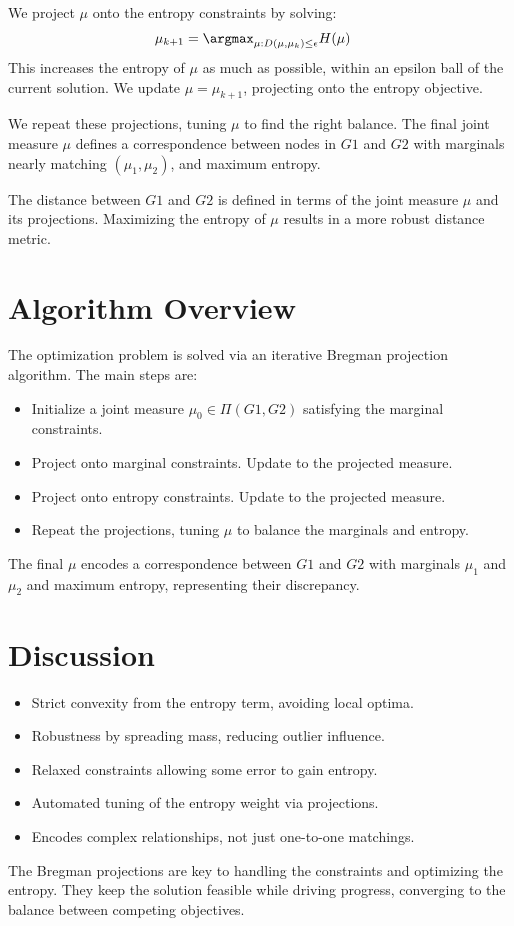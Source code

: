 \documentclass{article}
\begin{document}
We project $\mu$ onto the entropy constraints by solving:
\begin{align*}
\mu_{k+1}&=\argmax_{\mu : D(\mu, \mu_k) \le \epsilon} H(\mu)
\end{align*}
This increases the entropy of $\mu$ as much as possible, within an epsilon ball of the current solution. We update $\mu = \mu_{k+1}$, projecting onto the entropy objective.

We repeat these projections, tuning $\mu$ to find the right balance. The final joint measure $\mu$ defines a correspondence between nodes in $G1$ and $G2$ with marginals nearly matching $(\mu_1, \mu_2)$, and maximum entropy.

The distance between $G1$ and $G2$ is defined in terms of the joint measure $\mu$ and its projections. Maximizing the entropy of $\mu$ results in a more robust distance metric.

\section{Algorithm Overview}
The optimization problem is solved via an iterative Bregman projection algorithm. The main steps are:

\begin{itemize}
\item Initialize a joint measure $\mu_0 \in \Pi(G1,G2)$ satisfying the marginal constraints.
\item Project onto marginal constraints. Update to the projected measure.
\item Project onto entropy constraints. Update to the projected measure.
\item Repeat the projections, tuning $\mu$ to balance the marginals and entropy.
\end{itemize}

The final $\mu$ encodes a correspondence between $G1$ and $G2$ with marginals $\mu_1$ and $\mu_2$ and maximum entropy, representing their discrepancy.

\section{Discussion}
\begin{itemize}
\item Strict convexity from the entropy term, avoiding local optima.
\item Robustness by spreading mass, reducing outlier influence.
\item Relaxed constraints allowing some error to gain entropy.
\item Automated tuning of the entropy weight via projections.
\item Encodes complex relationships, not just one-to-one matchings.
\end{itemize}

The Bregman projections are key to handling the constraints and optimizing the entropy. They keep the solution feasible while driving progress, converging to the balance between competing objectives.
\end{document}
